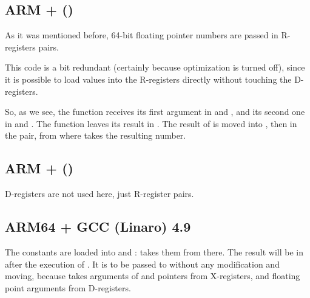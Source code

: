\subsection{ARM + \NonOptimizingXcodeIV (\ThumbTwoMode)}
\label{FPU_passing_floats_ARM}



As it was mentioned before, 64-bit floating pointer numbers are passed in R-registers pairs.

This code is a bit redundant (certainly because optimization is turned off), 
since it is possible to load values into the R-registers directly without touching the D-registers.

So, as we see, the  function receives its first argument in  and , and its second one in  and . 
The function leaves its result in  \AndENRU {}.
The result of  is moved into , then in the  \AndENRU {} pair, from where \printf takes the resulting number.

\subsection{ARM + \NonOptimizingKeilVI (\ARMMode)}



D-registers are not used here, just R-register pairs.

\subsection{ARM64 + \Optimizing GCC (Linaro) 4.9}



The constants are loaded into  and :  takes them from there.
The result will be in  after the execution of .
It is to be passed to \printf without any modification and moving, 
because \printf takes arguments of  
and pointers from X-registers, and floating point arguments from D-registers.

